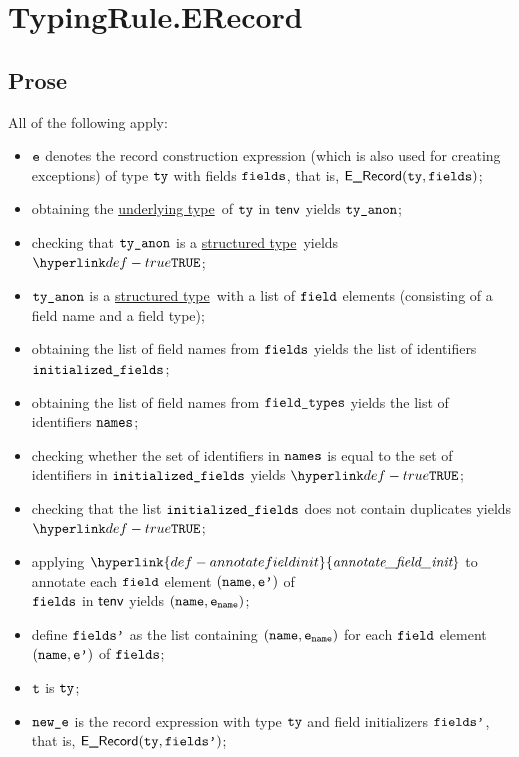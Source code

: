 \documentclass{book}
\newcommand\ProseOrTypeError[0]{\ProseTerminateAs{\TypeErrorConfig}}
\newcommand\annotatefieldinit[0]{\hyperlink{def-annotatefieldinit}{\textfunc{annotate\_field\_init}}}
\newcommand\structuredtype[0]{\hyperlink{def-structuredtype}{structured type}}
\newcommand\underlyingtype[0]{\hyperlink{def-underlyingtype}{underlying type}}
\newcommand\TypeErrorCode[1]{\texttt{TE\_#1}}
\newcommand\ExpectedStructuredType[0]{\hyperlink{def-expectedstructuredtype}{\TypeErrorCode{EST}}}
\begin{document}

\section{TypingRule.ERecord \label{sec:TypingRule.ERecord}}

\subsection{Prose}
All of the following apply:
\begin{itemize}
  \item $\texttt{e}$ denotes the record construction expression (which is also used for creating exceptions) of type $\texttt{ty}$ with fields $\texttt{fields}$,
        that is, $\textsf{E\_Record}(\texttt{ty}, \texttt{fields})$;
  \item obtaining the \underlyingtype\ of $\texttt{ty}$ in $\textsf{tenv}$ yields $\texttt{ty\_anon}$\ProseOrTypeError;
  \item checking that $\texttt{ty\_anon}$ is a \structuredtype\ yields $\True$\ProseOrTypeError;%
  \item $\texttt{ty\_anon}$ is a \structuredtype\ with a list of $\texttt{field}$ elements (consisting of a field name and a field type);
  \item obtaining the list of field names from $\texttt{fields}$ yields the list of identifiers \\
        $\texttt{initialized\_fields}$;
  \item obtaining the list of field names from $\texttt{field\_types}$ yields the list of identifiers $\texttt{names}$;
  \item checking whether the set of identifiers in $\texttt{names}$ is equal to the set of identifiers in $\texttt{initialized\_fields}$
        yields $\True$\ProseOrTypeError;
  \item checking that the list $\texttt{initialized\_fields}$ does not contain duplicates yields \\
        $\True$\ProseOrTypeError;
  \item applying $\annotatefieldinit$ to annotate each $\texttt{field}$ element $(\texttt{name},\texttt{e'})$ of \\
        $\texttt{fields}$ in $\textsf{tenv}$ yields $(\texttt{name},\texttt{e}_{\texttt{name}})$\ProseOrTypeError;
  \item define $\texttt{fields'}$ as the list containing $(\texttt{name},\texttt{e}_{\texttt{name}})$ for each $\texttt{field}$ element $(\texttt{name},\texttt{e'})$ of $\texttt{fields}$;
  \item $\texttt{t}$ is $\texttt{ty}$;
  \item $\texttt{new\_e}$ is the record expression with type $\texttt{ty}$ and field initializers $\texttt{fields'}$, that is, $\textsf{E\_Record}(\texttt{ty}, \texttt{fields'})$;
\end{itemize}
\end{document}
